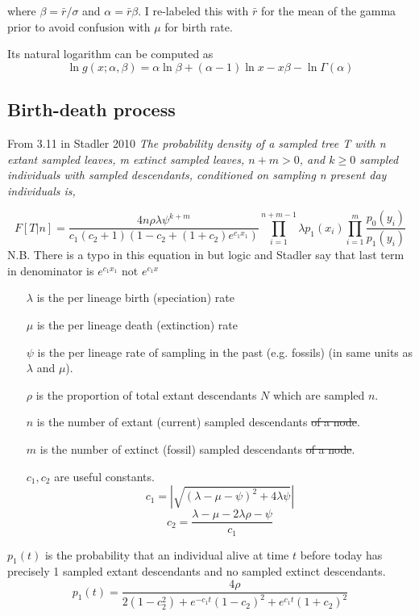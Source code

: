 \documentclass{llncs}
\newcommand{\ejmcomment}[1]{{\color{green} #1}}
\newcommand{\mthstrike}[1]{{\color{red}\sout{#1}}}
\begin{document}
where $\beta = \bar{r} / \sigma$ and $\alpha = \bar{r} \beta$.
\ejmcomment{I re-labeled this with $\bar{r}$ for the mean of the gamma prior to avoid confusion with $\mu$ for birth rate.}

Its natural logarithm can be computed as
$$ \ln g(x;\alpha,\beta) = \alpha\ln\beta + (\alpha-1)\ln x -x\beta - \ln\Gamma(\alpha) $$

\subsection{Birth-death process}
From 3.11 in Stadler 2010 \textit{The probability density of a sampled tree T with n
extant sampled leaves, m extinct sampled leaves, $n+m > 0$, and $k \geq 0$
sampled individuals with sampled descendants, conditioned on
sampling n present day individuals is,}

$$F[T|n] = \frac{4n\rho\lambda\psi^{k+m}}{c_1(c_2+1)(1-c_2+(1+c_2)e^{c_1x_1})}\prod_{i=1}^{n+m-1}\lambda p_1(x_i)\prod_{i=1}^{m}\frac{p_0(y_i)}{p_1(y_i)}$$
N.B. There is a typo in this equation in \cite{Stadler2010} but logic and Stadler say that last term in denominator is $e^{c_1x_1}$ not  $e^{c_1x}$ \\

\begin{enumerate}
\item[$\lambda$]  is the per lineage birth (speciation) rate
\item[$\mu$]  is the per lineage death (extinction) rate
\item[$\psi$]  is the per lineage rate of sampling in the past (e.g. fossils) (in same units as $\lambda$ and $\mu$).
\item[$\rho$ ] is the proportion of total extant descendants $N$ which are sampled $n$.
\item[$n$] is the number of extant (current) sampled descendants \mthstrike{of a node}.
\item[$m$] is the number of extinct (fossil) sampled descendants \mthstrike{of a node}.
\item[$c_1,c_2$]  are useful constants.
$$c_1 = |\sqrt{(\lambda-\mu-\psi)^2 + 4\lambda\psi}|$$
$$c_2 = \frac{\lambda-\mu-2\lambda\rho-\psi}{c_1}$$
\end{enumerate}

$p_1(t)$ is the probability that an individual alive at time $t$ before today has precisely 1 sampled extant descendants and no sampled extinct descendants.
$${p_1}(t) = \frac{4\rho}{2(1-c_2^2)+e^{-c_1t}(1-c_2)^2+e^{c_1t}(1+c_2)^2}$$
\end{document}
